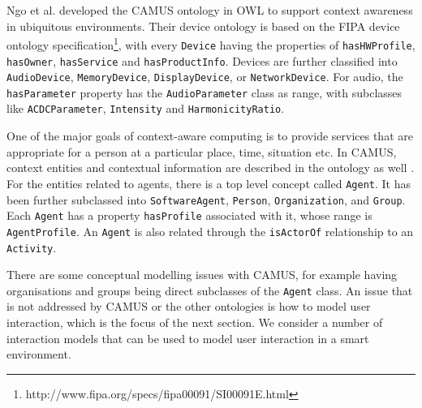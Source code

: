 Ngo et al. \cite{Ngo2004} developed the \ac{CAMUS} ontology in \ac{OWL} to support context awareness in ubiquitous environments. Their device ontology is based on the \ac{FIPA} device ontology specification\footnote{http://www.fipa.org/specs/fipa00091/SI00091E.html}, with every \texttt{Device} having the properties of \texttt{hasHWProfile}, \texttt{hasOwner}, \texttt{hasService} and \texttt{hasProductInfo}. Devices are further classified into \texttt{AudioDevice}, \texttt{MemoryDevice}, \texttt{DisplayDevice}, or \texttt{NetworkDevice}. For audio, the \texttt{hasParameter} property has the \texttt{Audio\-Parameter} class as range, with subclasses like \texttt{ACDC\-Parameter}, \texttt{In\-ten\-si\-ty} and \texttt{Harmonicity\-Ratio}. %

One of the major goals of context-aware computing is to provide services that are appropriate for a person at a particular place, time, situation etc. In \ac{CAMUS}, context entities and contextual information are described in the ontology as well \cite{Ngo2004}. For the entities related to agents, there is a top level concept called \texttt{Agent}. It has been further subclassed into \texttt{SoftwareAgent}, \texttt{Person}, \texttt{Organization}, and \texttt{Group}. Each \texttt{Agent} has a property \texttt{hasProfile} associated with it, whose range is \texttt{AgentProfile}. An \texttt{Agent} is also related through the \texttt{isActorOf} relationship to an \texttt{Activity}. %

There are some conceptual modelling issues with \ac{CAMUS}, for example having organisations and groups being direct subclasses of the \texttt{Agent} class. An issue that is not addressed by \ac{CAMUS} or the other ontologies is how to model user interaction, which is the focus of the next section. We consider a number of interaction models that can be used to model user interaction in a smart environment.



